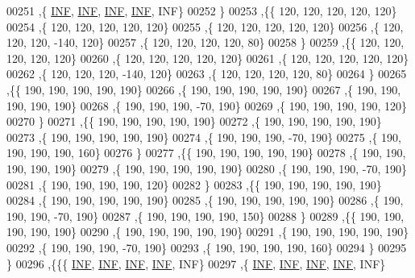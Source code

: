 \begin{DoxyCode}
00251   ,\{   \hyperlink{constants_8h_a12c2040f25d8e3a7b9e1c2024c618cb6}{INF},   \hyperlink{constants_8h_a12c2040f25d8e3a7b9e1c2024c618cb6}{INF},   \hyperlink{constants_8h_a12c2040f25d8e3a7b9e1c2024c618cb6}{INF},   \hyperlink{constants_8h_a12c2040f25d8e3a7b9e1c2024c618cb6}{INF},   INF\}
00252   \}
00253  ,\{\{   120,   120,   120,   120,   120\}
00254   ,\{   120,   120,   120,   120,   120\}
00255   ,\{   120,   120,   120,   120,   120\}
00256   ,\{   120,   120,   120,  -140,   120\}
00257   ,\{   120,   120,   120,   120,    80\}
00258   \}
00259  ,\{\{   120,   120,   120,   120,   120\}
00260   ,\{   120,   120,   120,   120,   120\}
00261   ,\{   120,   120,   120,   120,   120\}
00262   ,\{   120,   120,   120,  -140,   120\}
00263   ,\{   120,   120,   120,   120,    80\}
00264   \}
00265  ,\{\{   190,   190,   190,   190,   190\}
00266   ,\{   190,   190,   190,   190,   190\}
00267   ,\{   190,   190,   190,   190,   190\}
00268   ,\{   190,   190,   190,   -70,   190\}
00269   ,\{   190,   190,   190,   190,   120\}
00270   \}
00271  ,\{\{   190,   190,   190,   190,   190\}
00272   ,\{   190,   190,   190,   190,   190\}
00273   ,\{   190,   190,   190,   190,   190\}
00274   ,\{   190,   190,   190,   -70,   190\}
00275   ,\{   190,   190,   190,   190,   160\}
00276   \}
00277  ,\{\{   190,   190,   190,   190,   190\}
00278   ,\{   190,   190,   190,   190,   190\}
00279   ,\{   190,   190,   190,   190,   190\}
00280   ,\{   190,   190,   190,   -70,   190\}
00281   ,\{   190,   190,   190,   190,   120\}
00282   \}
00283  ,\{\{   190,   190,   190,   190,   190\}
00284   ,\{   190,   190,   190,   190,   190\}
00285   ,\{   190,   190,   190,   190,   190\}
00286   ,\{   190,   190,   190,   -70,   190\}
00287   ,\{   190,   190,   190,   190,   150\}
00288   \}
00289  ,\{\{   190,   190,   190,   190,   190\}
00290   ,\{   190,   190,   190,   190,   190\}
00291   ,\{   190,   190,   190,   190,   190\}
00292   ,\{   190,   190,   190,   -70,   190\}
00293   ,\{   190,   190,   190,   190,   160\}
00294   \}
00295  \}
00296 ,\{\{\{   \hyperlink{constants_8h_a12c2040f25d8e3a7b9e1c2024c618cb6}{INF},   \hyperlink{constants_8h_a12c2040f25d8e3a7b9e1c2024c618cb6}{INF},   \hyperlink{constants_8h_a12c2040f25d8e3a7b9e1c2024c618cb6}{INF},   \hyperlink{constants_8h_a12c2040f25d8e3a7b9e1c2024c618cb6}{INF},   INF\}
00297   ,\{   \hyperlink{constants_8h_a12c2040f25d8e3a7b9e1c2024c618cb6}{INF},   \hyperlink{constants_8h_a12c2040f25d8e3a7b9e1c2024c618cb6}{INF},   \hyperlink{constants_8h_a12c2040f25d8e3a7b9e1c2024c618cb6}{INF},   \hyperlink{constants_8h_a12c2040f25d8e3a7b9e1c2024c618cb6}{INF},   INF\}

\end{DoxyCode}
